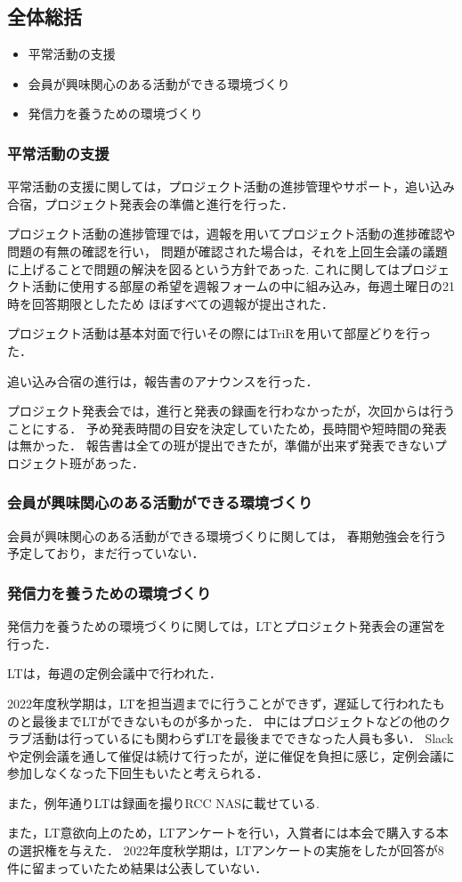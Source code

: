 \subsection*{全体総括}


\begin{itemize}
  \item 平常活動の支援
  \item 会員が興味関心のある活動ができる環境づくり
  \item 発信力を養うための環境づくり
\end{itemize}

\subsubsection*{平常活動の支援}
平常活動の支援に関しては，プロジェクト活動の進捗管理やサポート，追い込み合宿，プロジェクト発表会の準備と進行を行った．

プロジェクト活動の進捗管理では，週報を用いてプロジェクト活動の進捗確認や問題の有無の確認を行い，
問題が確認された場合は，それを上回生会議の議題に上げることで問題の解決を図るという方針であった.
これに関してはプロジェクト活動に使用する部屋の希望を週報フォームの中に組み込み，毎週土曜日の21時を回答期限としたため
ほぼすべての週報が提出された．

プロジェクト活動は基本対面で行いその際にはTriRを用いて部屋どりを行った．

追い込み合宿の進行は，報告書のアナウンスを行った．

プロジェクト発表会では，進行と発表の録画を行わなかったが，次回からは行うことにする．
予め発表時間の目安を決定していたため，長時間や短時間の発表は無かった．
報告書は全ての班が提出できたが，準備が出来ず発表できないプロジェクト班があった．

\subsubsection*{会員が興味関心のある活動ができる環境づくり}
会員が興味関心のある活動ができる環境づくりに関しては，
春期勉強会を行う予定しており，まだ行っていない．

\subsubsection*{発信力を養うための環境づくり}
発信力を養うための環境づくりに関しては，LTとプロジェクト発表会の運営を行った．

LTは，毎週の定例会議中で行われた．

2022年度秋学期は，LTを担当週までに行うことができず，遅延して行われたものと最後までLTができないものが多かった．
中にはプロジェクトなどの他のクラブ活動は行っているにも関わらずLTを最後までできなった人員も多い．
Slackや定例会議を通して催促は続けて行ったが，逆に催促を負担に感じ，定例会議に参加しなくなった下回生もいたと考えられる．

また，例年通りLTは録画を撮りRCC NASに載せている.

また，LT意欲向上のため，LTアンケートを行い，入賞者には本会で購入する本の選択権を与えた．
2022年度秋学期は，LTアンケートの実施をしたが回答が8件に留まっていたため結果は公表していない．
